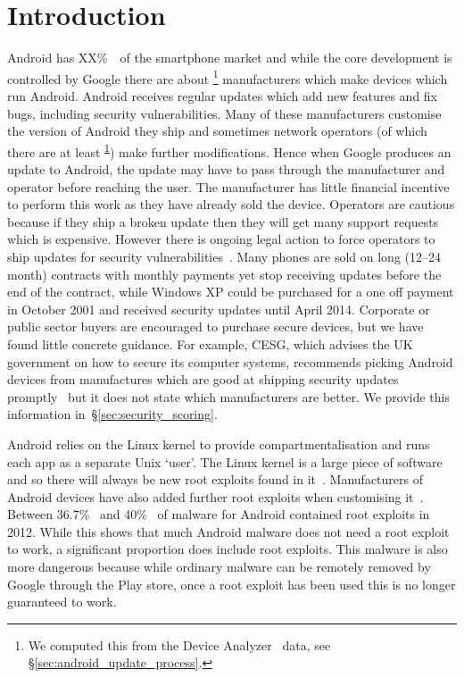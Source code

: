 \documentclass[conference,a4paper,twoside]{IEEEtran}
\let\OldTodo\todo
\renewcommand{\todo}{\OldTodo[inline]}
\newcommand{\todolater}[1]{}%
\newcommand{\da}{Device Analyzer}
\newcommand{\dafoot}{\textsuperscript{\ref{foot:dadata}}}
\newcommand{\percMarketShare}{XX\%~\cite{TODO}}
\begin{document}
\section{Introduction}
Android has \percMarketShare\ of the smartphone market and while the core development is controlled by Google there are about \daNumManufacturers\footnote{\label{foot:dadata}We computed this from the \da~\cite{Wagner2013} data, see \S\ref{sec:android_update_process}.} manufacturers which make devices which run Android.
Android receives regular updates  which add new features and fix bugs, including security vulnerabilities.
Many of these manufacturers customise the version of Android they ship and sometimes network operators (of which there are at least \daNumOperators\dafoot) make further modifications.
Hence when Google produces an update to Android, the update may have to pass through the manufacturer and operator before reaching the user.
The manufacturer has little financial incentive to perform this work as they have already sold the device.
Operators are cautious because if they ship a broken update then they will get many support requests which is expensive.
However there is ongoing legal action to force operators to ship updates for security vulnerabilities~\cite{Soghoian2013}.\todolater{Check on the status of this legal action}
Many phones are sold on long (12--24 month) contracts with monthly payments yet stop receiving updates before the end of the contract,\todolater{Is there a survey of the distribution of contract lengths and phone purchase methods?} while Windows XP could be purchased for a one off payment in October 2001 and received security updates until April 2014.
Corporate or public sector buyers are encouraged to purchase secure devices, but we have found little concrete guidance. For example, CESG, which advises the UK government on how to secure its computer systems, recommends picking Android devices from manufactures which are good at shipping security updates promptly~\cite{CESG2013} but it does not state which manufacturers are better.\todolater{Which other advisory organisations give that advice?}
We provide this information in~\S\ref{sec:security_scoring}.

Android relies on the Linux kernel to provide compartmentalisation and runs each app as a separate Unix `user'.
The Linux kernel is a large piece of software and so there will always be new root exploits found in it~\cite{TODO}.
Manufacturers of Android devices have also added further root exploits when customising it~\cite{Grace2012}.
Between 36.7\%~\cite{Zhou2012b} and 40\%~\cite{Zhou2012a} of malware for Android contained root exploits in 2012.
While this shows that much Android malware does not need a root exploit to work, a significant proportion does include root exploits.
This malware is also more dangerous because while ordinary malware can be remotely removed by Google through the Play store, once a root exploit has been used this is no longer guaranteed to work.
\end{document}
